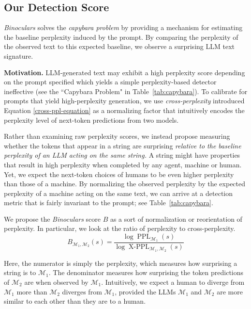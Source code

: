 \documentclass{article} %
\DeclareMathOperator{\PPL}{PPL} %
\DeclareMathOperator{\xPPL}{X-PPL} %
\newcommand{\update}[1]{{{#1}}}
\begin{document}
\subsection{Our Detection Score}
\label{sec:our-score}
 
{\em Binoculars} solves the \textit{capybara problem} by providing a mechanism for estimating the baseline perplexity induced by the prompt. By comparing the perplexity of the observed text to this expected baseline, we observe a surprising LLM text signature.


\update{
\textbf{Motivation.} 
LLM-generated text may exhibit a high perplexity score depending on the prompt specified which yields a simple perplexity-based detector ineffective (see the ``Capybara Problem" in Table~\ref{tab:capybara}). To calibrate for prompts that yield high-perplexity generation, we use \emph{cross-perplexity} introduced Equation \eqref{cross-ppl-equation} as a normalizing factor that intuitively encodes the perplexity level of next-token predictions from two models.
}

Rather than examining raw perplexity scores, we instead propose measuring whether the tokens that appear in a string are surprising {\em relative to the baseline perplexity of an LLM acting on the same string.}  
A string might have properties that result in high perplexity when completed by any agent, machine or human.  
Yet, we expect the next-token choices of humans to be even higher perplexity than those of a machine.  
By normalizing the observed perplexity by the expected perplexity of a machine acting on the same text, we can arrive at a detection metric that is fairly invariant to the prompt; see Table~\ref{tab:capybara}.

We propose the {\em Binoculars} score $B$ as a sort of normalization or reorientation of perplexity.
In particular, we look at the ratio of perplexity to cross-perplexity. 
\begin{equation}\label{eq:binoculars}
    B_{\mathcal M_1, \mathcal M_2}(s) = \frac{\update{\log}\PPL_{\mathcal M_1}(s)}{\update{\log}\xPPL_{\mathcal M_1, \mathcal M_2}(s)}
\end{equation}

Here, the numerator is simply the perplexity, which measures how surprising a string is to $\mathcal M_1$.
The denominator measures how surprising the token predictions of $\mathcal M_2$ are when observed by $\mathcal M_1.$  Intuitively, we expect a human to diverge from  $\mathcal M_1$ more than  $\mathcal M_2$ diverges from  $\mathcal M_1$, provided the LLMs $\mathcal M_1$ and  $\mathcal M_2$ are more similar to each other than they are to a human.  
\end{document}
